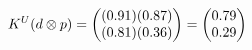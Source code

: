 \documentclass[preview]{standalone}
\begin{document}
\begin{align*}
\special{dvisvgm:raw <g id='unique000'>}K^U(d \otimes p) = \begin{pmatrix} (0.91)(0.87) \\ (0.81)(0.36) \end{pmatrix} = \begin{pmatrix} 0.79 \\ 0.29 \end{pmatrix}\special{dvisvgm:raw </g>}
\end{align*}
\end{document}
